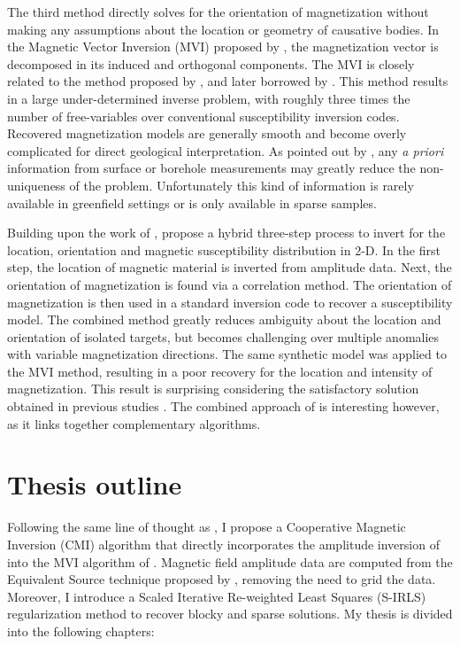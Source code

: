 The third method directly solves for the orientation of magnetization without making any assumptions about the location or geometry of causative bodies.
In the Magnetic Vector Inversion (MVI) proposed by \cite{Lelievre2009}, the magnetization vector is decomposed in its induced and orthogonal components.
The MVI is closely related to the method proposed by \cite{Kubota2005}, and later borrowed by \cite{Ellis2012}.
This method results in a large under-determined inverse problem, with roughly three times the number of free-variables over conventional susceptibility inversion codes.
Recovered magnetization models are generally smooth and become overly complicated for direct geological interpretation.
As pointed out by \cite{PhDLelievre09}, any \emph{a priori} information from surface or borehole measurements may greatly reduce the non-uniqueness of the problem.
Unfortunately this kind of information is rarely available in greenfield settings or is only available in sparse samples.

Building upon the work of \cite{Shearer05}, \cite{Liu2015} propose a hybrid three-step process to invert for the location, orientation and magnetic susceptibility distribution in 2-D.
In the first step, the location of magnetic material is inverted from amplitude data.
Next, the orientation of magnetization is found via a correlation method.
The orientation of magnetization is then used in a standard inversion code to recover a susceptibility model.
The combined method greatly reduces ambiguity about the location and orientation of isolated targets, but becomes challenging over multiple anomalies with variable magnetization directions.
The same synthetic model was applied to the MVI method, resulting in a poor recovery for the location and intensity of magnetization.
This result is surprising considering the satisfactory solution obtained in previous studies \cite[]{Ellis2012, Lelievre2009}.
The combined approach of \cite{Liu2015} is interesting however, as it links together complementary algorithms.

\section{Thesis outline}
Following the same line of thought as \cite{Liu2015}, I propose a Cooperative Magnetic Inversion (CMI) algorithm that directly incorporates the amplitude inversion of \cite{Shearer05} into the MVI algorithm of \cite{Lelievre2009}.
Magnetic field amplitude data are computed from the Equivalent Source technique proposed by \cite{Li2010}, removing the need to grid the data.
Moreover, I introduce a Scaled Iterative Re-weighted Least Squares (S-IRLS) regularization method to recover blocky and sparse solutions.
My thesis is divided into the following chapters:

